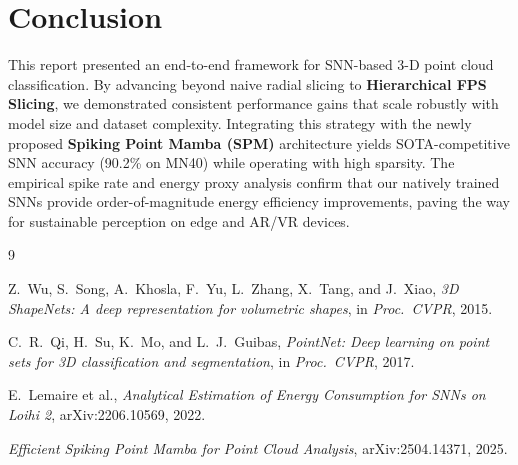 \documentclass[11pt,a4paper]{article}
\begin{document}
\section{Conclusion}

This report presented an end-to-end framework for SNN-based 3-D point cloud classification.
By advancing beyond naive radial slicing to \textbf{Hierarchical FPS Slicing}, we demonstrated
consistent performance gains that scale robustly with model size and dataset complexity.
Integrating this strategy with the newly proposed \textbf{Spiking Point Mamba (SPM)} architecture
yields SOTA-competitive SNN accuracy (90.2\% on MN40) while operating with high sparsity.
The empirical spike rate and energy proxy analysis confirm that our natively trained SNNs
provide order-of-magnitude energy efficiency improvements, paving the way for sustainable
perception on edge and AR/VR devices.

\begin{thebibliography}{9}

Z.\ Wu, S.\ Song, A.\ Khosla, F.\ Yu, L.\ Zhang, X.\ Tang, and J.\ Xiao,
\textit{3D ShapeNets: A deep representation for volumetric shapes},
in \textit{Proc.\ CVPR}, 2015.

C.\ R.\ Qi, H.\ Su, K.\ Mo, and L.\ J.\ Guibas,
\textit{PointNet: Deep learning on point sets for 3D classification and
segmentation},
in \textit{Proc.\ CVPR}, 2017.

E.\ Lemaire et al.,
\textit{Analytical Estimation of Energy Consumption for SNNs on Loihi 2},
arXiv:2206.10569, 2022.

\textit{Efficient Spiking Point Mamba for Point Cloud Analysis},
arXiv:2504.14371, 2025.

\end{thebibliography}
\end{document}
